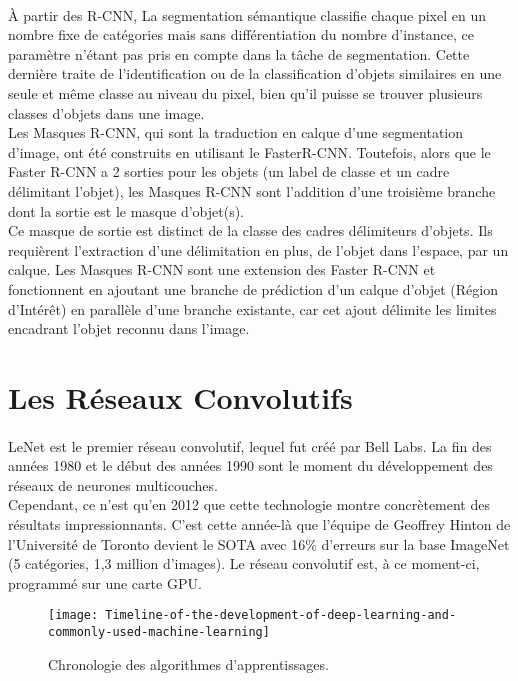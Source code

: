 \documentclass[
10pt, %
a4paper, %
oneside, %
headinclude,footinclude, %
]{scrartcl}
\begin{document}
\paragraph{}À partir des \gls{R-CNN}, La segmentation sémantique classifie chaque pixel en un nombre fixe de catégories mais sans différentiation du nombre d’instance, ce paramètre n’étant pas pris en compte dans la tâche de segmentation. Cette dernière traite de l’identification ou de la classification d’objets similaires en une seule et même classe au niveau du pixel, bien qu’il puisse se trouver plusieurs classes d’objets dans une image.\\
Les Masques R-CNN, qui sont la traduction en calque d’une segmentation d’image, ont été construits en utilisant le \gls{FasterR-CNN}. Toutefois, alors que le Faster R-CNN a 2 sorties pour les objets (un label de classe et un cadre délimitant l’objet), les Masques R-CNN sont l’addition d’une troisième branche dont la sortie est le masque d’objet(s).
\\
Ce masque de sortie est distinct de la classe des cadres délimiteurs d’objets. Ils requièrent l’extraction d’une délimitation en plus, de l’objet dans l’espace, par un calque. Les Masques R-CNN sont une extension des Faster R-CNN et fonctionnent en ajoutant une branche de prédiction d’un calque d’objet (Région d’Intérêt) en parallèle d’une branche existante, car cet ajout délimite les limites encadrant l’objet reconnu dans l’image.


\section{Les Réseaux Convolutifs}

\paragraph{}LeNet est le premier réseau convolutif, lequel fut créé par Bell Labs.
La fin des années 1980 et le début des années 1990 sont le moment du développement des réseaux de neurones multicouches.\\
Cependant, ce n’est qu’en 2012 que cette technologie montre concrètement des résultats impressionnants. C’est cette année-là que l’équipe de Geoffrey Hinton de l’Université de Toronto devient le SOTA avec 16\% d’erreurs sur la base ImageNet (5 catégories, 1,3 million d’images). Le réseau convolutif est, à ce moment-ci, programmé sur une carte GPU.
\begin{figure}[htb]
\centering 
\texttt{[image: Timeline-of-the-development-of-deep-learning-and-commonly-used-machine-learning]} 
\caption[Chronologie des Algorithmes d’Apprentissages]{Chronologie des algorithmes d’apprentissages.} 
\label{fig:gallery} 
\end{figure}
\end{document}
